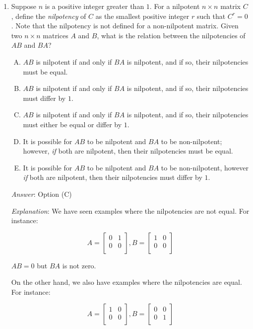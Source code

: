 \documentclass[10pt]{amsart}
\begin{document}
\begin{enumerate}
  {\em Historical note (last time, appeared in a midterm)}: $21$ out of
  $30$ people got this. $5$ chose (C), $4$ chose (D).

\item Suppose $n$ is a positive integer greater than $1$. For a
  nilpotent $n \times n$ matrix $C$, define the {\em nilpotency} of
  $C$ as the smallest positive integer $r$ such that $C^r = 0$. Note
  that the nilpotency is not defined for a non-nilpotent matrix. Given
  two $n \times n$ matrices $A$ and $B$, what is the relation between
  the nilpotencies of $AB$ and $BA$?

  \begin{enumerate}[(A)]
  \item $AB$ is nilpotent if and only if $BA$ is nilpotent, and if
    so, their nilpotencies must be equal.
  \item $AB$ is nilpotent if and only if $BA$ is nilpotent, and if so,
    their nilpotencies must differ by $1$.
  \item $AB$ is nilpotent if and only if $BA$ is nilpotent, and if so,
    their nilpotencies must either be equal or differ by $1$.
  \item It is possible for $AB$ to be nilpotent and $BA$ to be
    non-nilpotent; however, {\em if} both are nilpotent, then their
    nilpotencies must be equal.
  \item It is possible for $AB$ to be nilpotent and $BA$ to be
    non-nilpotent, however {\em if} both are nilpotent, then their
    nilpotencies must differ by $1$.
  \end{enumerate}

  {\em Answer}: Option (C)

  {\em Explanation}: We have seen examples where the nilpotencies are
  not equal. For instance:

  $$A = \left[\begin{matrix} 0 & 1 \\ 0 & 0 \\\end{matrix}\right], B = \left[ \begin{matrix} 1 & 0 \\ 0 & 0 \\\end{matrix}\right]$$

  $AB = 0$ but $BA$ is not zero.

  On the other hand, we also have examples where the nilpotencies are
  equal. For instance:

  $$A = \left[\begin{matrix} 1 & 0 \\ 0 & 0 \\\end{matrix}\right], B = \left[ \begin{matrix} 0 & 0 \\ 0 & 1 \\\end{matrix}\right]$$


\end{enumerate}
\end{document}
